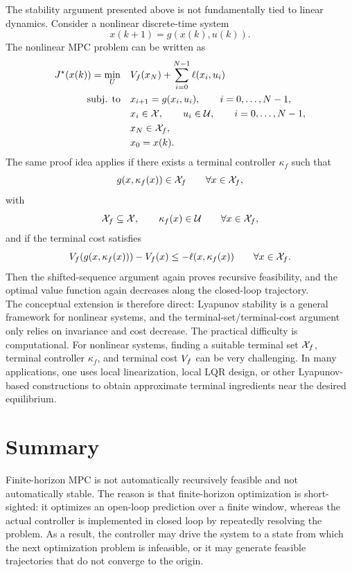 The stability argument presented above is not fundamentally tied to linear dynamics. Consider
a nonlinear discrete-time system
\[
    x(k+1)=g(x(k),u(k)).
\]
The nonlinear MPC problem can be written as
\[
\begin{aligned}
    J^\star(x(k))
    =
    \min_U \quad
    & V_f(x_N)
    +
    \sum_{i=0}^{N-1}\ell(x_i,u_i) \\
    \text{subj. to} \quad
    & x_{i+1}=g(x_i,u_i), \qquad i=0,\ldots,N-1,\\
    & x_i\in\mathcal{X},\qquad u_i\in\mathcal{U},\qquad i=0,\ldots,N-1,\\
    & x_N\in\mathcal{X}_f,\\
    & x_0=x(k).
\end{aligned}
\]
The same proof idea applies if there exists a terminal controller \(\kappa_f\) such that
\[
    g(x,\kappa_f(x))\in\mathcal{X}_f
    \qquad
    \forall x\in\mathcal{X}_f,
\]
with
\[
    \mathcal{X}_f\subseteq\mathcal{X},
    \qquad
    \kappa_f(x)\in\mathcal{U}
    \qquad
    \forall x\in\mathcal{X}_f,
\]
and if the terminal cost satisfies
\[
    V_f(g(x,\kappa_f(x)))-V_f(x)
    \leq
    -\ell(x,\kappa_f(x))
    \qquad
    \forall x\in\mathcal{X}_f.
\]
Then the shifted-sequence argument again proves recursive feasibility, and the optimal value
function again decreases along the closed-loop trajectory.\\
The conceptual extension is therefore direct: Lyapunov stability is a general framework for
nonlinear systems, and the terminal-set/terminal-cost argument only relies on invariance and
cost decrease. The practical difficulty is computational. For nonlinear systems, finding a suitable
terminal set \(\mathcal{X}_f\), terminal controller \(\kappa_f\), and terminal cost \(V_f\) can be
very challenging. In many applications, one uses local linearization, local LQR design, or other
Lyapunov-based constructions to obtain approximate terminal ingredients near the desired
equilibrium.

\section{Summary}

Finite-horizon MPC is not automatically recursively feasible and not automatically stable. The
reason is that finite-horizon optimization is short-sighted: it optimizes an open-loop prediction
over a finite window, whereas the actual controller is implemented in closed loop by repeatedly
resolving the problem. As a result, the controller may drive the system to a state from which
the next optimization problem is infeasible, or it may generate feasible trajectories that do not
converge to the origin.\\

